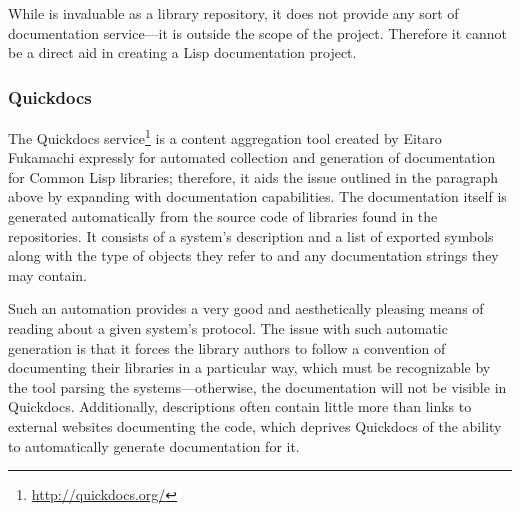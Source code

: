 While \ql{} is invaluable as a library repository, it does not provide any sort of documentation service---it is outside the scope of the \ql{} project. Therefore it cannot be a direct aid in creating a Lisp documentation project.

\subsubsection{Quickdocs}

The Quickdocs service\footnote{\url{http://quickdocs.org/}} is a content aggregation tool created by Eitaro Fukamachi expressly for automated collection and generation of documentation for Common Lisp libraries; therefore, it aids the issue outlined in the paragraph above by expanding \ql{} with documentation capabilities. The documentation itself is generated automatically from the source code of libraries found in the \ql{} repositories. It consists of a system's \ql{} description and a list of exported symbols along with the type of objects they refer to and any documentation strings they may contain.

Such an automation provides a very good and aesthetically pleasing means of reading about a given system's protocol. The issue with such automatic generation is that it forces the library authors to follow a convention of documenting their libraries in a particular way, which must be recognizable by the tool parsing the \ql{} systems---otherwise, the documentation will not be visible in Quickdocs. Additionally, \ql{} descriptions often contain little more than links to external websites documenting the code, which deprives Quickdocs of the ability to automatically generate documentation for it.